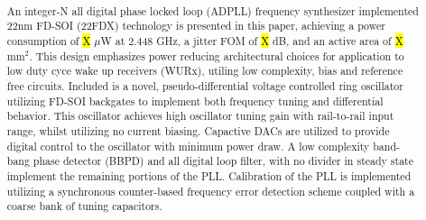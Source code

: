 

\pagestyle{fancy}
\fancyhf{}
\fancyhead[LE,RO]{\fontfamily{\sfdefault}\selectfont \textbf{\rightmark}}
\title{\textbf{}}
\date{}

\sloppy\RaggedRight\raggedbottom
	
	
	\pagebreak

	\justify
	\setcounter{page}{1}
	\thispagestyle{nohdr}
	\large\fontfamily{\sfdefault}\selectfont \		
	\begin{abstract} \large\fontfamily{\rmdefault}\selectfont \
		
		\vspace{-2em}An integer-N all digital phase locked loop (ADPLL) frequency synthesizer implemented 22nm FD-SOI (22FDX) technology is presented in this paper, achieving a power consumption of \hl{X} $\mu$W at 2.448 GHz, a jitter FOM of \hl{X} dB, and an active area of \hl{X} mm$^2$. This design emphasizes power reducing architectural choices for application to low duty cyce wake up receivers (WURx), utiling low complexity, bias and reference free circuits. Included is a novel, pseudo-differential voltage controlled ring oscillator utilizing FD-SOI backgates to implement both frequency tuning and differential behavior. This oscillator achieves high oscillator tuning gain with rail-to-rail input range, whilst utilizing no current biasing. Capactive DACs are utilized to provide digital control to the oscillator with minimum power draw. A low complexity band-bang phase detector (BBPD) and all digital loop filter, with no divider in steady state implement the remaining portions of the PLL. Calibration of the PLL is implemented utilizing a synchronous counter-based frequency error detection scheme coupled with a coarse bank of tuning capacitors.
	\end{abstract}

